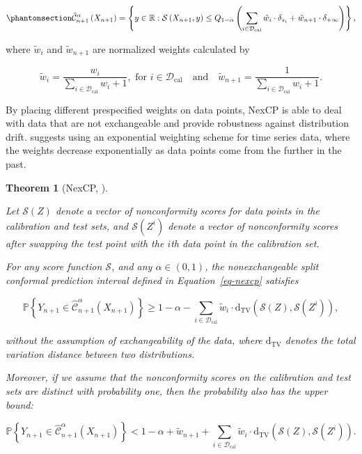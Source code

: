 \documentclass[
  11pt,
  a4paper,
]{article}
\theoremstyle{plain}
\theoremstyle{plain}
\newtheorem{theorem}{Theorem}[section]
\theoremstyle{remark}
\begin{document}
\begin{equation}\phantomsection\label{eq-nexcp}{
\hat{\mathcal{C}}_{n+1}^{\alpha}\left(X_{n+1}\right) = \left\{y\in\mathbb{R}: \mathcal{S}\left(X_{n+1}, y\right) \leq Q_{1-\alpha}\left(\sum_{i \in \mathcal{D}_{\text{cal}}}\tilde{w}_i\cdot\delta_{s_{i}}+\tilde{w}_{n+1}\cdot\delta_{+\infty}\right)\right\},
}\end{equation}

where \(\tilde{w}_i\) and \(\tilde{w}_{n+1}\) are normalized weights
calculated by

\[
\tilde{w}_i = \frac{w_i}{\sum_{i\in\mathcal{D}_{\text{cal}}}w_i+1}, \text{ for } i \in \mathcal{D}_{\text{cal}} \quad \text{and} \quad \tilde{w}_{n+1} =  \frac{1}{\sum_{i\in\mathcal{D}_{\text{cal}}}w_i+1}.
\]

By placing different prespecified weights on data points, NexCP is able
to deal with data that are not exchangeable and provide robustness
against distribution drift. \textcite{barber2023} suggests using an
exponential weighting scheme for time series data, where the weights
decrease exponentially as data points come from the further in the past.

\begin{theorem}[NexCP,
\textcite{barber2023}]\protect\hypertarget{thm-nexcp}{}\label{thm-nexcp}

Let \(\mathcal{S}(Z)\) denote a vector of nonconformity scores for data
points in the calibration and test sets, and \(\mathcal{S}(Z^i)\) denote
a vector of nonconformity scores after swapping the test point with the
\(i\)th data point in the calibration set.

For any score function \(\mathcal{S}\), and any \(\alpha\in(0,1)\), the
nonexchangeable split conformal prediction interval defined in
Equation~\ref{eq-nexcp} satisfies

\[
\mathbb{P}\left\{Y_{n+1} \in \hat{\mathcal{C}}_{n+1}^{\alpha}\left(X_{n+1}\right)\right\} \geq 1-\alpha-\sum_{i \in \mathcal{D}_{\text{cal}}} \tilde{w}_i \cdot \mathrm{d}_{\mathrm{TV}}\left(\mathcal{S}(Z), \mathcal{S}\left(Z^i\right)\right),
\]

without the assumption of exchangeability of the data, where
\(\mathrm{d}_{\mathrm{TV}}\) denotes the total variation distance
between two distributions.

Moreover, if we assume that the nonconformity scores on the calibration
and test sets are distinct with probability one, then the probability
also has the upper bound:

\[
\mathbb{P}\left\{Y_{n+1} \in \hat{\mathcal{C}}_{n+1}^{\alpha}\left(X_{n+1}\right)\right\} < 1-\alpha+\tilde{w}_{n+1}+\sum_{i \in \mathcal{D}_{\text{cal}}} \tilde{w}_i \cdot \mathrm{d}_{\mathrm{TV}}\left(\mathcal{S}(Z), \mathcal{S}\left(Z^i\right)\right).
\]

\end{theorem}
\end{document}
